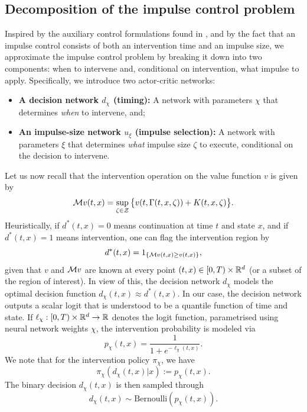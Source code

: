 \subsection{Decomposition of the impulse control problem}
Inspired by the auxiliary control formulations found in \cite{jain2025impulse, mguni2022timing}, and by the fact that an impulse control consists of both an intervention time and an impulse size, we approximate the impulse control problem by breaking it down into two components: when to intervene and, conditional on intervention, what impulse to apply. Specifically, we introduce two actor-critic networks:
\begin{itemize}
    \item \textbf{A decision network $d_\chi$ (timing):} A network with parameters $\chi$ that determines \emph{when} to intervene, and;
    \item \textbf{An impulse-size network $u_\xi$ (impulse selection):} A network with parameters $\xi$ that determines \emph{what} impulse size $\zeta$ to execute, conditional on the decision to intervene.
\end{itemize}
Let us now recall that the intervention operation on the value function $v$ is given by
\begin{equation*}
    \mathcal{M} v(t,x) = \sup_{\zeta \in \mathcal{Z}} \big \{ v(t,\Gamma(t,x,\zeta)) + K(t,x,\zeta) \big\}. 
\end{equation*}
Heuristically, if $d^*(t,x)=0$ means continuation at time $t$ and state $x$, and if $d^*(t,x)=1$ means intervention, one can flag the intervention region by 
\begin{equation*}
    d^*(t,x) = 1_{\left\{\mathcal{M} v(t,x) \geq v(t,x)\right\}},
\end{equation*}
given that $v$ and $\mathcal{M} v$ are known at every point $(t,x) \in [0,T)\times \mathbb{R}^d$ (or a subset of the region of interest). In view of this, the decision network $d_\chi$ models the optimal decision function $d_\chi(t,x) \approx d^*(t,x)$. 
In our case, the decision network outputs a scalar logit that is understood to be a quantile function of time and state. If $\ell_\chi: [0,T)\times \mathbb{R}^d \rightarrow \mathbb{R}$ denotes the logit function, parametrised using neural network weights $\chi$, the intervention probability is modeled via
\begin{equation}
    p_\chi (t,x) = \frac{1}{1+e^{-\ell_\chi(t,x)}}. 
    \label{eqn: p chi}
\end{equation}
We note that for the intervention policy $\pi_\chi$, we have 
\begin{equation*}
    \pi_\chi(d_\chi(t,x) | x):=p_\chi (t,x).
\end{equation*}
The binary decision $d_\chi(t,x)$ is then sampled through
\begin{equation*}
    d_\chi(t,x) \sim \text{Bernoulli} \left(p_\chi(t,x)\right). 
\end{equation*}

